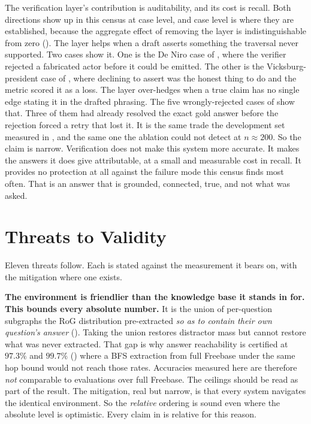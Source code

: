 The verification layer's contribution is auditability, and its cost is recall.
Both directions show up in this census at case level, and case level is where
they are established, because the aggregate effect of removing the layer is
indistinguishable from zero (). The layer helps when a draft
asserts something the traversal never supported. Two cases show it. One is the
De Niro case of , where the verifier rejected a
fabricated actor before it could be emitted. The other is the
Vicksburg-president case of , where declining to
assert was the honest thing to do and the metric scored it as a loss. The layer
over-hedges when a true claim has no single edge stating it in the drafted
phrasing. The five wrongly-rejected cases of  show
that. Three of them had already resolved the exact gold answer before the
rejection forced a retry that lost it. It is the same trade the development set
measured in , and the same one the ablation could not
detect at $n \approx 200$. So the claim is narrow. Verification does not make
this system more accurate. It makes the answers it does give attributable, at a
small and measurable cost in recall. It provides no protection at all against
the failure mode this census finds most often. That is an answer that is
grounded, connected, true, and not what was asked.

\section{Threats to Validity}\label{sec:threats}

Eleven threats follow. Each is stated against the measurement it bears on, with
the mitigation where one exists.

\textbf{The environment is friendlier than the knowledge base it stands in for.
This bounds every absolute number.} It is the union of per-question subgraphs
the RoG distribution pre-extracted \emph{so as to contain their own question's
answer} (). Taking the union restores distractor mass but
cannot restore what was never extracted. That gap is why answer reachability is
certified at $97.3\%$ and $99.7\%$ () where a BFS
extraction from full Freebase under the same hop bound would not reach those
rates. Accuracies measured here are therefore \emph{not} comparable to
evaluations over full Freebase. The ceilings should be read as part of the
result. The mitigation, real but narrow, is that every system navigates the
identical environment. So the \emph{relative} ordering is sound even where the
absolute level is optimistic. Every claim in  is relative for
this reason.

